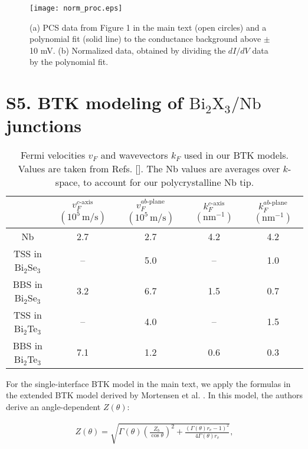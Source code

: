 \documentclass[aps,prl,onecolumn,notitlepage,reprintnumbers,amsmath,amssymb,superscriptaddress,citeautoscript]{revtex4-1}
\begin{document}
\begin{figure}[ht]
\texttt{[image: norm\_proc.eps]}
\caption{\label{fig:fitting}(a) PCS data from Figure 1 in the main text (open circles) and a polynomial fit (solid line) to the conductance background above $\pm$ 10 mV. (b) Normalized data, obtained by dividing the $dI/dV$ data by the polynomial fit.}
\end{figure}


\section{S5. BTK modeling of $\text{Bi}_{2}\text{X}_{3}/\text{Nb}$ junctions}


\begin{table}[bh]
\begin{center}
\begin{tabular}{|c|c|c|c|c|}
\hline
 & $v_{F}^{c\text{-axis}}$ $\left(10^{5}\,\text{m/s}\right)$ & $v_{F}^{ab\text{-plane}}$ $\left(10^{5}\,\text{m/s}\right)$ & $k_{F}^{c\text{-axis}}$ $\left(\text{nm}^{-1}\right)$ & $k_{F}^{ab\text{-plane}}$ $\left(\text{nm}^{-1}\right)$ \\ \hline
Nb & 2.7 & 2.7 & 4.2 & 4.2 \\ \hline
TSS in Bi$_{2}$Se$_{3}$ & -- & 5.0 & -- & 1.0 \\ \hline
BBS in Bi$_{2}$Se$_{3}$ & 3.2 & 6.7 & 1.5 & 0.7 \\ \hline
TSS in Bi$_{2}$Te$_{3}$ & -- & 4.0 & -- & 1.5 \\ \hline
BBS in Bi$_{2}$Te$_{3}$ & 7.1 & 1.2 & 0.6 & 0.3 \\ 
\hline
\end{tabular}
\end{center}
\caption{\label{tab:Fermi_values} Fermi velocities $v_F$ and wavevectors $k_F$ used in our BTK models. Values are taken from  Refs. []. The Nb values are averages over $k$-space, to account for our polycrystalline Nb tip.}
\end{table}

For the single-interface BTK model in the main text, we apply the formulas in the extended BTK model derived by Mortensen et al. \cite{Mortensen1999}. In this model, the authors derive an angle-dependent $Z(\theta)$:

\begin{align*}
Z(\theta)=\sqrt{\Gamma(\theta)\left(\frac{Z_b}{\cos\theta}\right)^2+\frac{\left(\Gamma(\theta)r_v-1\right)^2}{4\Gamma(\theta)r_v}},
\label{eq:Z}
\end{align*}
\end{document}
